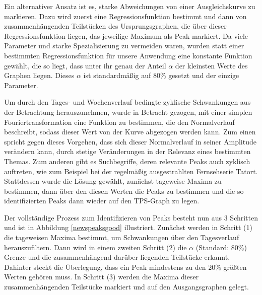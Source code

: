 Ein alternativer Ansatz ist es, starke Abweichungen von einer Ausgleichskurve zu markieren. Dazu wird zuerst eine Regressionsfunktion bestimmt und dann von zusammenhängenden Teilstücken des Ursprungsgraphen, die über dieser Regressionsfunktion liegen, das jeweilige Maximum als Peak markiert. Da viele Parameter und starke Spezialisierung zu vermeiden waren, wurden statt einer bestimmten Regressionsfunktion für unsere Anwendung eine konstante Funktion gewählt, die so liegt, dass unter ihr genau der Anteil $\alpha$ der kleinsten Werte des Graphen liegen. Dieses $\alpha$ ist standardmäßig auf 80\% gesetzt und der einzige Parameter.

Um durch den Tages- und Wochenverlauf bedingte zyklische Schwankungen aus der Betrachtung herauszunehmen, wurde in Betracht gezogen, mit einer simplen Fouriertransformation eine Funktion zu bestimmen, die den Normalverlauf beschreibt, sodass dieser Wert von der Kurve abgezogen werden kann. Zum einen spricht gegen dieses Vorgehen, dass sich dieser Normalverlauf in seiner Amplitude verändern kann, durch stetige Veränderungen in der Relevanz eines bestimmten Themas. Zum anderen gibt es Suchbegriffe, deren relevante Peaks auch zyklisch auftreten, wie zum Beispiel bei der regelmäßig ausgestrahlten Fernsehserie Tatort. Stattdessen wurde die Lösung gewählt, zunächst tageweise Maxima zu bestimmen, dann über den diesen Werten die Peaks zu bestimmen und die so identifizierten Peaks dann wieder auf den TPS-Graph zu legen.

Der vollständige Prozess zum Identifizieren von Peaks besteht nun aus 3 Schritten und ist in Abbildung \ref{newspeaksgood} illustriert. Zunächst werden in Schritt (1) die tageweisen Maxima bestimmt, um Schwankungen über den Tagesverlauf herauszufiltern. Dann wird in einem zweiten Schritt (2) die $\alpha$ (Standard: 80\%) Grenze und die zusammenhängend darüber liegenden Teilstücke erkannt. Dahinter steckt die Überlegung, dass ein Peak mindestens zu den 20\% größten Werten gehören muss. In Schritt (3) werden die Maxima dieser zusammenhängenden Teilstücke markiert und auf den Ausgangsgraphen gelegt.


